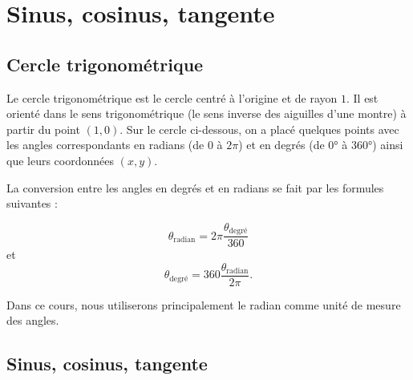 \documentclass[11pt,class=report,crop=false]{standalone}
\begin{document}


%
%




\section{Sinus, cosinus, tangente}

\subsection{Cercle trigonométrique}


Le cercle trigonométrique est le cercle centré à l'origine et de rayon $1$.
Il est orienté dans le sens trigonométrique (le sens inverse des aiguilles d'une montre) à partir du point $(1,0)$. Sur le cercle ci-dessous, on a placé quelques points avec les angles correspondants en radians (de $0$ à $2 \pi$) et en degrés (de $\ang{0}$ à $\ang{360}$) ainsi que leurs coordonnées $(x,y)$.
 



La conversion entre les angles en degrés et en radians se fait par les formules suivantes :

$$\theta_{\text{radian}} = 2\pi \frac{\theta_{\text{degré}}}{360}$$
et
$$\theta_{\text{degré}} = 360 \frac{\theta_{\text{radian}}}{2\pi}.$$

Dans ce cours, nous utiliserons principalement le radian comme unité de mesure des angles.


\subsection{Sinus, cosinus, tangente}
\end{document}
